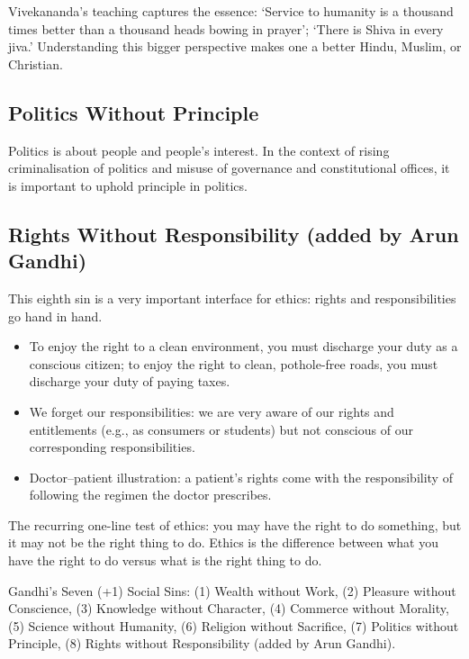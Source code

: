 \begin{KeyConcept}
Vivekananda's teaching captures the essence: `Service to humanity is a thousand times better than a thousand heads bowing in prayer'; `There is Shiva in every jiva.' Understanding this bigger perspective makes one a better Hindu, Muslim, or Christian.
\end{KeyConcept}

\subsection{Politics Without Principle}

Politics is about people and people's interest. In the context of rising criminalisation of politics and misuse of governance and constitutional offices, it is important to uphold principle in politics.

\subsection{Rights Without Responsibility (added by Arun Gandhi)}

This eighth sin is a very important interface for ethics: rights and responsibilities go hand in hand.

\begin{itemize}
\item To enjoy the right to a clean environment, you must discharge your duty as a conscious citizen; to enjoy the right to clean, pothole-free roads, you must discharge your duty of paying taxes.
\item We forget our responsibilities: we are very aware of our rights and entitlements (e.g., as consumers or students) but not conscious of our corresponding responsibilities.
\item Doctor--patient illustration: a patient's rights come with the responsibility of following the regimen the doctor prescribes.
\end{itemize}

\begin{CriticalPoint}
The recurring one-line test of ethics: you may have the right to do something, but it may not be the right thing to do. Ethics is the difference between what you have the right to do versus what is the right thing to do.
\end{CriticalPoint}

\begin{QuickRevision}
Gandhi's Seven (+1) Social Sins: (1) Wealth without Work, (2) Pleasure without Conscience, (3) Knowledge without Character, (4) Commerce without Morality, (5) Science without Humanity, (6) Religion without Sacrifice, (7) Politics without Principle, (8) Rights without Responsibility (added by Arun Gandhi).
\end{QuickRevision}

